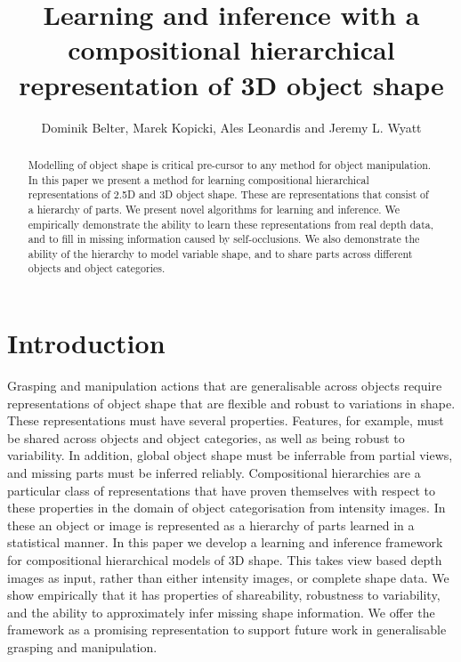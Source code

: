 \documentclass[letterpaper,10pt,conference]{ieeeconf}  %
\title{\LARGE \bf
 Learning and inference with a compositional hierarchical representation of 3D object shape
}
\author{Dominik Belter, Marek Kopicki, Ales Leonardis and Jeremy L. Wyatt%
}
\begin{document}
\maketitle
\thispagestyle{empty}
\pagestyle{empty}


\begin{abstract}
Modelling of object shape is critical pre-cursor to any method for object manipulation. In this paper we present a method for learning compositional hierarchical representations of 2.5D and 3D object shape. These are representations that consist of a hierarchy of parts. We present novel algorithms for learning and inference. We empirically demonstrate the ability to learn these representations from real depth data, and to fill in missing information caused by self-occlusions. We also demonstrate the ability of the hierarchy to model variable shape, and to share parts across different objects and object categories.
\end{abstract}



\section{Introduction}

Grasping and manipulation actions that are generalisable across objects require representations of object shape that are flexible and robust to variations in shape. These representations must have several properties.  Features, for example, must be shared across objects and object categories, as well as being robust to variability. In addition, global object shape must be inferrable from partial views, and missing parts must be inferred reliably. Compositional hierarchies are a particular class of representations that have proven themselves with respect to these properties in the domain of object categorisation from intensity images. In these an object or image is represented as a hierarchy of parts learned in a statistical manner. In this paper we develop a learning and inference framework for compositional hierarchical models of 3D shape. This takes view based depth images as input, rather than either intensity images, or complete shape data. We show empirically that it has properties of shareability, robustness to variability, and the ability to approximately infer missing shape information. We offer the framework as a promising representation to support future work in generalisable grasping and manipulation.
\end{document}
